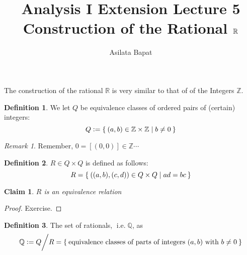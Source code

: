 \documentclass[12pt]{amsart}
\title{Analysis I Extension Lecture 5\\Construction of the Rational $\bbR$}
\author{Asilata Bapat}
\newcommand{\bbR}{\mathbb{R}}
\newcommand{\bbZ}{\mathbb{Z}}
\newcommand{\bbQ}{\mathbb{Q}}
\newcommand{\ie}{\operatorname{i.e.}}
\theoremstyle{plain}
\newtheorem*{claim}{Claim}
\theoremstyle{remark}
\newtheorem*{rmk}{Remark}
\theoremstyle{definition}
\newtheorem*{define}{Definition}
\begin{document}
\maketitle
{}

The construction of the rational $\bbR$ is very similar to that of of the Integers $\bbZ$.
\begin{define}
	We let $Q$ be equivalence classes of ordered pairs of (certain) integers:
	\begin{equation*}
		Q \vcentcolon = \Set{(a,b) \in \bbZ \times \bbZ | b \neq 0}
	\end{equation*}
\end{define}

\begin{rmk}
	Remember, $0 = [(0,0)] \in \bbZ\cdots$
\end{rmk}

\begin{define}
	$R\in Q \times Q$ is defined as follows:
	\begin{equation*}
		R = \Set{((a,b), (c,d)) \in Q \times Q | ad = bc}
	\end{equation*}
\end{define}
\begin{claim}
	$R$ is an equivalence relation
\end{claim}
\begin{proof}
	Exercise.
\end{proof}

\begin{define}
	The set of rationals, $\ie \bbQ$, as 
	\begin{equation*}
		\bbQ \vcentcolon = Q\bigg/ R= \Set{\mbox{equivalence classes of parts of integers } (a,b) \mbox{ with } b \neq 0}
	\end{equation*}
\end{define}
\end{document}
